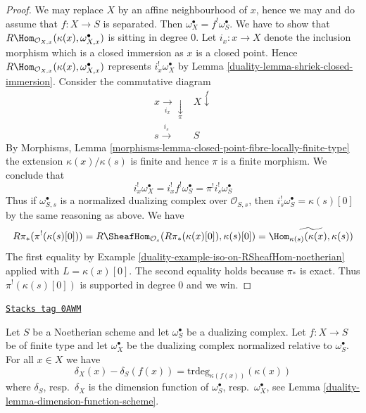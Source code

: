 \begin{proof}

We may replace $X$ by an affine neighbourhood of $x$, hence we may
and do assume that $f : X \to S$ is separated.
Then $\omega_X^\bullet = f^!\omega_S^\bullet$. We have to show that
$R\Hom_{\mathcal{O}_{X, x}}(\kappa(x), \omega_{X, x}^\bullet)$
is sitting in degree $0$. Let $i_x : x \to X$ denote the inclusion
morphism which is a closed immersion as $x$ is a closed point.
Hence $R\Hom_{\mathcal{O}_{X, x}}(\kappa(x), \omega_{X, x}^\bullet)$
represents $i_x^!\omega_X^\bullet$ by
Lemma \ref{duality-lemma-shriek-closed-immersion}.
Consider the commutative diagram
$$
\begin{array}{cc}x \underset{i_x}{\longrightarrow}\underset{\pi}{\downarrow} & X \overset{f}{\downarrow} \\ s \overset{i_s}{\longrightarrow} & S\end{array}
$$
By Morphisms, Lemma
\ref{morphisms-lemma-closed-point-fibre-locally-finite-type}
the extension $\kappa(x)/\kappa(s)$ is finite and hence
$\pi$ is a finite morphism. We conclude that
$$
i_x^!\omega_X^\bullet = i_x^! f^! \omega_S^\bullet =
\pi^! i_s^! \omega_S^\bullet
$$
Thus if $\omega_{S, s}^\bullet$ is a normalized dualizing complex
over $\mathcal{O}_{S, s}$, then $i_s^!\omega_S^\bullet = \kappa(s)[0]$
by the same reasoning as above. We have
$$
R\pi_*(\pi^!(\kappa(s)[0])) =
R\SheafHom_{\mathcal{O}_s}(R\pi_*(\kappa(x)[0]), \kappa(s)[0]) =
\widetilde{\Hom_{\kappa(s)}(\kappa(x), \kappa(s))}
$$
The first equality by Example \ref{duality-example-iso-on-RSheafHom-noetherian}
applied with $L = \kappa(x)[0]$. The second equality holds because
$\pi_*$ is exact.
Thus $\pi^!(\kappa(s)[0])$ is supported in degree $0$ and we win.
\end{proof}

\begin{lemma}
\label{duality-lemma-good-dualizing-dimension-function}
\href{https://stacks.math.columbia.edu/tag/0AWM}{\texttt{Stacks tag 0AWM}}

Let $S$ be a Noetherian scheme and let $\omega_S^\bullet$ be a
dualizing complex. Let $f : X \to S$ be of finite type
and let $\omega_X^\bullet$ be the dualizing complex
normalized relative to $\omega_S^\bullet$. For all $x \in X$ we have
$$
\delta_X(x) - \delta_S(f(x)) = \text{trdeg}_{\kappa(f(x))}(\kappa(x))
$$
where $\delta_S$, resp.\ $\delta_X$
is the dimension function of
$\omega_S^\bullet$, resp.\ $\omega_X^\bullet$, see
Lemma \ref{duality-lemma-dimension-function-scheme}.
\end{lemma}

